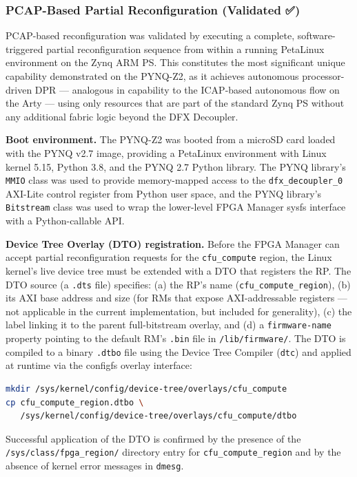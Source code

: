 \subsubsection{PCAP-Based Partial Reconfiguration (Validated ✅)}

PCAP-based reconfiguration was validated by executing a complete, software-triggered partial reconfiguration sequence from within a running PetaLinux environment on the Zynq ARM PS. This constitutes the most significant unique capability demonstrated on the PYNQ-Z2, as it achieves autonomous processor-driven DPR — analogous in capability to the ICAP-based autonomous flow on the Arty — using only resources that are part of the standard Zynq PS without any additional fabric logic beyond the DFX Decoupler.

\textbf{Boot environment.} The PYNQ-Z2 was booted from a microSD card loaded with the PYNQ v2.7 image, providing a PetaLinux environment with Linux kernel 5.15, Python 3.8, and the PYNQ 2.7 Python library. The PYNQ library's \texttt{MMIO} class was used to provide memory-mapped access to the \texttt{dfx\_decoupler\_0} AXI-Lite control register from Python user space, and the PYNQ library's \texttt{Bitstream} class was used to wrap the lower-level FPGA Manager sysfs interface with a Python-callable API.

\textbf{Device Tree Overlay (DTO) registration.} Before the FPGA Manager can accept partial reconfiguration requests for the \texttt{cfu\_compute} region, the Linux kernel's live device tree must be extended with a DTO that registers the RP. The DTO source (a \texttt{.dts} file) specifies: (a) the RP's name (\texttt{cfu\_compute\_region}), (b) its AXI base address and size (for RMs that expose AXI-addressable registers — not applicable in the current implementation, but included for generality), (c) the label linking it to the parent full-bitstream overlay, and (d) a \texttt{firmware-name} property pointing to the default RM's \texttt{.bin} file in \texttt{/lib/firmware/}. The DTO is compiled to a binary \texttt{.dtbo} file using the Device Tree Compiler (\texttt{dtc}) and applied at runtime via the configfs overlay interface:

\begin{lstlisting}[style=mystyle, language=bash]
mkdir /sys/kernel/config/device-tree/overlays/cfu_compute
cp cfu_compute_region.dtbo \
   /sys/kernel/config/device-tree/overlays/cfu_compute/dtbo
\end{lstlisting}

Successful application of the DTO is confirmed by the presence of the \texttt{/sys/class/fpga\_region/} directory entry for \texttt{cfu\_compute\_region} and by the absence of kernel error messages in \texttt{dmesg}.

